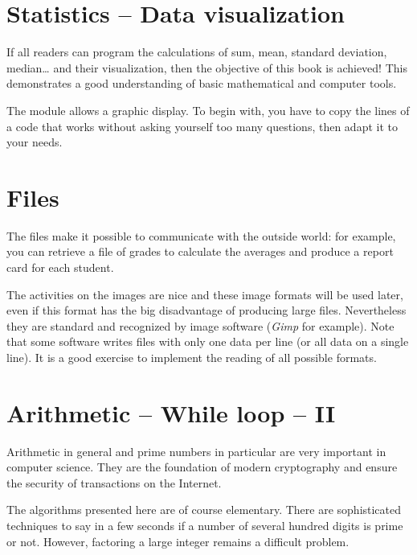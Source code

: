 \documentclass[11pt,class=report,crop=false]{standalone}
\begin{document}
\section{Statistics -- Data visualization}

If all readers can program the calculations of sum, mean, standard deviation, median\ldots{} and their visualization, then the objective of this book is achieved! This demonstrates a good understanding of basic mathematical and computer tools.

The  module allows a graphic display. To begin with, you have to copy the lines of a code that works without asking yourself too many questions, then adapt it to your needs.


\section{Files}

The files make it possible to communicate \Python{} with the outside world: for example, you can retrieve a file of grades to calculate the averages and produce a report card for each student.

The activities on the images are nice and these image formats will be used later, even if this format has the big disadvantage of producing large files. Nevertheless they are standard and recognized by image software (\emph{Gimp} for example). Note that some software writes files with only one data per line (or all data on a single line). It is a good exercise to implement the reading of all possible formats.


\section{Arithmetic -- While loop -- II}

Arithmetic in general and prime numbers in particular are very important in computer science. They are the foundation of modern cryptography and ensure the security of transactions on the Internet.

The algorithms presented here are of course elementary. There are sophisticated techniques to say in a few seconds if a number of several hundred digits is prime or not. However, factoring a large integer remains a difficult problem.
\end{document}
